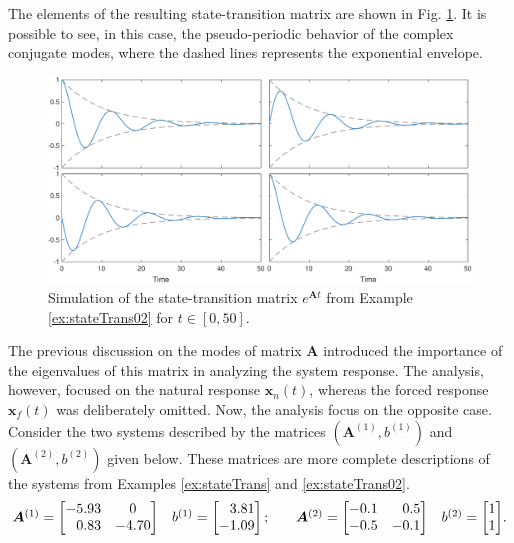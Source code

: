 \documentclass[a4paper,11pt]{book}
\numberwithin{figure}{chapter}
\numberwithin{equation}{chapter}
\numberwithin{table}{chapter}
\theoremstyle{definition}
\begin{document}
The elements of the resulting state-transition matrix are shown in Fig. \ref{fig:stateTrans02}. It is possible to see, in this case, the pseudo-periodic behavior of the complex conjugate modes, where the dashed lines represents the exponential envelope. 

\begin{figure}[ht] \centering
    \includegraphics[width=\textwidth]{chapter2/stateTrans02}
    
    \caption{Simulation of the state-transition matrix $e^{\bm{A} t}$ from Example \ref{ex:stateTrans02} for $t \in [0,50]$.}
    \label{fig:stateTrans02}
\end{figure}

The previous discussion on the modes of matrix $\bm{A}$ introduced the importance of the eigenvalues of this matrix in analyzing the system response. The analysis, however, focused on the natural response $\bm{x}_n(t)$, whereas the forced response $\bm{x}_f(t)$ was deliberately omitted. Now, the analysis focus on the opposite case. Consider the two systems described by the matrices $(\bm{A}^{(1)}, b^{(1)})$ and $(\bm{A}^{(2)}, b^{(2)})$ given below. These matrices are more complete descriptions of the systems from Examples \ref{ex:stateTrans} and \ref{ex:stateTrans02}. 
\begin{equation} \label{eq:isoSys02}
\begin{matrix}
    \bm{A}^{(1)} = \begin{bmatrix} 
        -5.93  &      0 \\
        \hfill 0.83   &  -4.70 
    \end{bmatrix} & b^{(1)} = \begin{bmatrix} \phantom{-}3.81 \\ -1.09 \end{bmatrix}; & & \bm{A}^{(2)} = \begin{bmatrix} 
         -0.1  &  \hfill 0.5 \\
        -0.5   &  -0.1 
    \end{bmatrix} & b^{(2)} = \begin{bmatrix} 1 \\ 1 \end{bmatrix}
\end{matrix}
.\end{equation}
\end{document}
